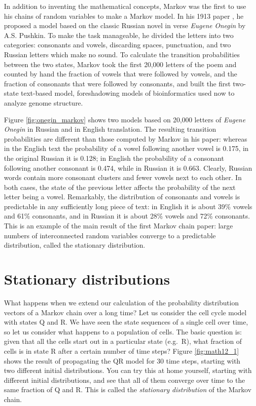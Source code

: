 \documentclass[
]{book}
\theoremstyle{definition}
\theoremstyle{definition}
\theoremstyle{definition}
\theoremstyle{remark}
\begin{document}
In addition to inventing the mathematical concepts, Markov was the first to use his chains of random variables to make a Markov model. In his 1913 paper \citep{markov_example_1913}, he proposed a model based on the classic Russian novel in verse \emph{Eugene Onegin} by A.S. Pushkin. To make the task manageable, he divided the letters into two categories: consonants and vowels, discarding spaces, punctuation, and two Russian letters which make no sound. To calculate the transition probabilities between the two states, Markov took the first 20,000 letters of the poem and counted by hand the fraction of vowels that were followed by vowels, and the fraction of consonants that were followed by consonants, and built the first two-state text-based model, foreshadowing models of bioinformatics used now to analyze genome structure.

Figure \ref{fig:onegin_markov} shows two models based on 20,000 letters of \emph{Eugene Onegin} in Russian and in English translation. The resulting transition probabilities are different than those computed by Markov in his paper: whereas in the English text the probability of a vowel following another vowel is 0.175, in the original Russian it is 0.128; in English the probability of a consonant following another consonant is 0.474, while in Russian it is 0.663. Clearly, Russian words contain more consonant clusters and fewer vowels next to each other. In both cases, the state of the previous letter affects the probability of the next letter being a vowel. Remarkably, the distribution of consonants and vowels is predictable in any sufficiently long piece of text: in English it is about 39\% vowels and 61\% consonants, and in Russian it is about 28\% vowels and 72\% consonants. This is an example of the main result of the first Markov chain paper: large numbers of interconnected random variables converge to a predictable distribution, called the stationary distribution.

\hypertarget{stationary-distributions}{%
\section{Stationary distributions}\label{stationary-distributions}}

What happens when we extend our calculation of the probability distribution vectors of a Markov chain over a long time? Let us consider the cell cycle model with states Q and R. We have seen the state sequences of a single cell over time, so let us consider what happens to a population of cells. The basic question is: given that all the cells start out in a particular state (e.g.~R), what fraction of cells is in state R after a certain number of time steps? Figure \ref{fig:math12_1} shows the result of propagating the QR model for 30 time steps, starting with two different initial distributions. You can try this at home yourself, starting with different initial distributions, and see that all of them converge over time to the same fraction of Q and R. This is called the \emph{stationary distribution} of the Markov chain.
\end{document}
